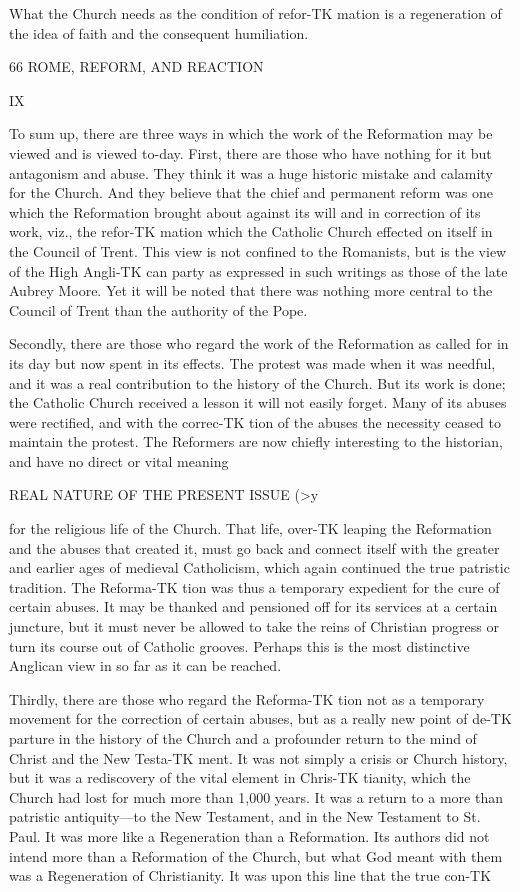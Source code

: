 \documentclass[12pt,a5paper,oneside]{book}
\begin{document}
What the Church needs as the condition of refor-TK
mation is a regeneration of the idea of faith and 
the consequent humiliation. 



66 ROME, REFORM, AND REACTION 

IX 

To sum up, there are three ways in which the 
work of the Reformation may be viewed and is viewed 
to-day. First, there are those who have nothing for 
it but antagonism and abuse. They think it was a 
huge historic mistake and calamity for the Church. 
And they believe that the chief and permanent reform 
was one which the Reformation brought about against 
its will and in correction of its work, viz., the refor-TK
mation which the Catholic Church effected on itself 
in the Council of Trent. This view is not confined 
to the Romanists, but is the view of the High Angli-TK
can party as expressed in such writings as those of the 
late Aubrey Moore. Yet it will be noted that there 
was nothing more central to the Council of Trent 
than the authority of the Pope. 

Secondly, there are those who regard the work of 
the Reformation as called for in its day but now spent 
in its effects. The protest was made when it was 
needful, and it was a real contribution to the history of 
the Church. But its work is done; the Catholic 
Church received a lesson it will not easily forget. 
Many of its abuses were rectified, and with the correc-TK
tion of the abuses the necessity ceased to maintain the 
protest. The Reformers are now chiefly interesting 
to the historian, and have no direct or vital meaning 



REAL NATURE OF THE PRESENT ISSUE (>y 

for the religious life of the Church. That life, over-TK
leaping the Reformation and the abuses that created 
it, must go back and connect itself with the greater 
and earlier ages of medieval Catholicism, which again 
continued the true patristic tradition. The Reforma-TK
tion was thus a temporary expedient for the cure of 
certain abuses. It may be thanked and pensioned off 
for its services at a certain juncture, but it must never 
be allowed to take the reins of Christian progress or 
turn its course out of Catholic grooves. Perhaps this 
is the most distinctive Anglican view in so far as it 
can be reached. 

Thirdly, there are those who regard the Reforma-TK
tion not as a temporary movement for the correction 
of certain abuses, but as a really new point of de-TK
parture in the history of the Church and a profounder 
return to the mind of Christ and the New Testa-TK
ment. It was not simply a crisis or Church history, 
but it was a rediscovery of the vital element in Chris-TK
tianity, which the Church had lost for much more 
than 1,000 years. It was a return to a more than 
patristic antiquity---to the New Testament, and in the 
New Testament to St. Paul. It was more like a 
Regeneration than a Reformation. Its authors did not 
intend more than a Reformation of the Church, but 
what God meant with them was a Regeneration of 
Christianity. It was upon this line that the true con-TK
\end{document}
